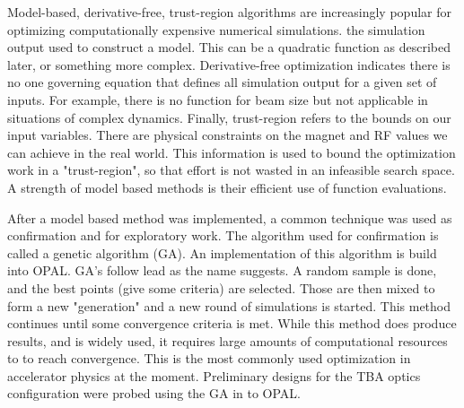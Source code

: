 Model-based, derivative-free, trust-region algorithms 
are increasingly popular for optimizing computationally 
expensive numerical simulations.  the simulation output  used to construct a 
model. This can be a quadratic function as described later, 
or something more complex.
Derivative-free optimization indicates there is no one 
governing equation that defines all simulation output
for a given set of inputs. For example, there is no 
function for beam size 
but  not applicable in situations of complex dynamics.
Finally, trust-region refers to the bounds on our input variables.
There are physical constraints on the magnet and RF values we 
can achieve in the real world. This information is used 
to bound the optimization work in a "trust-region", so that
effort is not wasted in an infeasible search space.
A strength of model based methods is their efficient use of function evaluations. 

After a model based method was implemented, a common technique was 
used as confirmation  and for exploratory work.  The algorithm used for confirmation 
is called a genetic algorithm (GA). An implementation of this algorithm is
build into OPAL. GA's follow  lead as the name suggests.
A random sample is done, and the best points  (give some criteria) 
are selected. Those  are then mixed to form a new "generation"
and a new round of simulations is started. This method continues
until some convergence criteria is met. While this method does 
produce results, and is widely used, it requires large amounts 
of computational resources to to reach convergence.
This is the most commonly used optimization in accelerator physics
at the moment. Preliminary designs 
for the TBA optics configuration were probed using the GA in to OPAL. 



